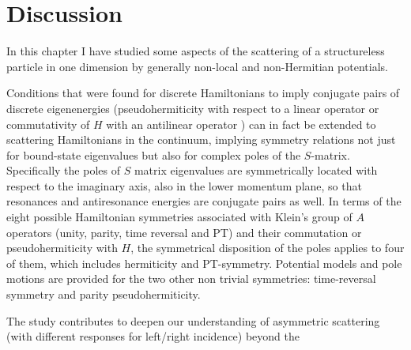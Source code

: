 \section{Discussion}
\label{sec:chapter2_Discussion}

In this chapter I have studied some aspects of the scattering of a structureless particle in one dimension by
generally non-local and non-Hermitian potentials.

Conditions that were found for discrete Hamiltonians to imply conjugate pairs of discrete eigenenergies
(pseudohermiticity with respect to a linear operator or commutativity of $H$ with an antilinear operator \cite{Mostafazadeh2002,Mostafazadeh2002a,Mostafazadeh2002b}) can in fact be extended to scattering Hamiltonians in the continuum, implying symmetry relations not just for bound-state eigenvalues
but also for complex
poles of the $S$-matrix. Specifically the poles of $S$ matrix eigenvalues
are symmetrically located with respect to the imaginary axis, also in the lower momentum plane, so that resonances and antiresonance
energies are conjugate pairs as well.
In  terms of the eight possible Hamiltonian symmetries associated with Klein's group of $A$ operators (unity, parity, time reversal and PT)
and their commutation or pseudohermiticity with $H$,
the symmetrical disposition of the poles applies to four of them, which includes hermiticity and PT-symmetry. Potential models
and pole motions are provided for the
two other non trivial symmetries: time-reversal symmetry and parity pseudohermiticity.

The study contributes to deepen our understanding of asymmetric scattering  (with different responses for left/right incidence) beyond the
